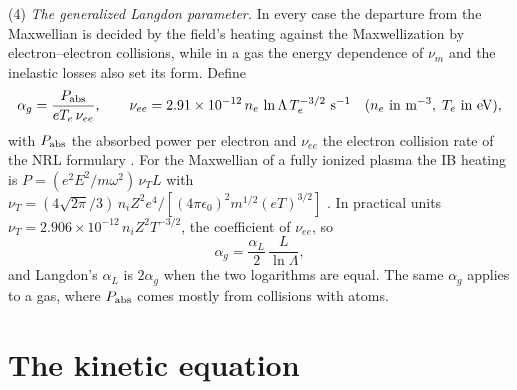 \documentclass[11pt]{article}
\numberwithin{equation}{section}
\newcommand{\lnL}{\ln\Lambda}
\begin{document}
{\noindent}(4) \emph{The generalized Langdon parameter.} In every case the departure
from the Maxwellian is decided by the field's heating against the Maxwellization by
electron--electron collisions, while in a gas the energy dependence of $\nu_m$ and the
inelastic losses also set its form. Define
\begin{equation}
\alpha_g=\frac{P_{\rm abs}}{eT_e\,\nu_{ee}},\qquad
\nu_{ee}=2.91\times10^{-12}\,n_e\,\lnL\,T_e^{-3/2}~{\rm s}^{-1}
\quad(n_e~\text{in m}^{-3},\;T_e~\text{in eV}),
\label{eq:alphag}
\end{equation}
with $P_{\rm abs}$ the absorbed power per electron and $\nu_{ee}$ the electron
collision rate of the NRL formulary \cite{NRL}. For the Maxwellian of a fully ionized plasma
the IB heating is $P=(e^2E^2/m\omega^2)\,\nu_TL$ with
$\nu_T=(4\sqrt{2\pi}/3)\,n_iZ^2e^4/[(4\pi\epsilon_0)^2m^{1/2}(eT)^{3/2}]$
\cite{Atzeni2004}. In practical units
$\nu_T=2.906\times10^{-12}\,n_iZ^2T^{-3/2}$, the coefficient of $\nu_{ee}$, so
\begin{equation}
\alpha_g=\frac{\alpha_L}{2}\,\frac{L}{\lnL},
\label{eq:alphag-alphaL}
\end{equation}
and Langdon's $\alpha_L$ is $2\alpha_g$ when the two logarithms are equal. The
same $\alpha_g$ applies to a gas, where $P_{\rm abs}$ comes mostly from collisions
with atoms.

\section{The kinetic equation}
\label{sec:kinetic}
\end{document}
